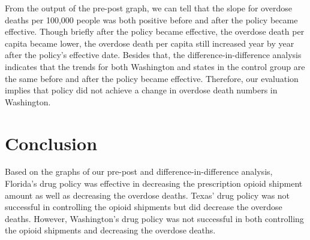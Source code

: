 \documentclass[12pt,letterpaper]{article}
\begin{document}
From the output of the pre-post graph, we can tell that the slope for overdose deaths per 100,000 people was both positive before and after the policy became effective. Though briefly after the policy became effective, the overdose death per capita became lower, the overdose death per capita still increased year by year after the policy's effective date. Besides that, the difference-in-difference analysis indicates that the trends for both Washington and states in the control group are the same before and after the policy became effective. Therefore, our evaluation implies that policy did not achieve a change in overdose death numbers in Washington.


\section{Conclusion}

Based on the graphs of our pre-post and difference-in-difference analysis, Florida's drug policy was effective in decreasing the prescription opioid shipment amount as well as decreasing the overdose deaths. Texas' drug policy was not successful in controlling the opioid shipments but did decrease the overdose deaths. However, Washington's drug policy was not successful in both controlling the opioid shipments and decreasing the overdose deaths.
\end{document}

